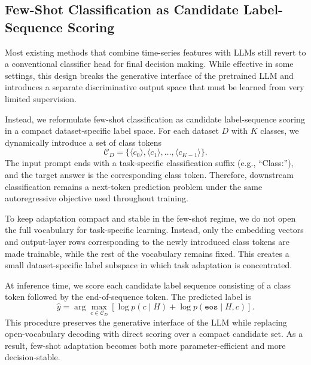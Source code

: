 \documentclass{article}
\begin{document}
        \subsection{Few-Shot Classification as Candidate Label-Sequence Scoring}
        
        Most existing methods that combine time-series features with LLMs still revert to a conventional classifier head for final decision making.
        While effective in some settings, this design breaks the generative interface of the pretrained LLM and introduces a separate discriminative output space that must be learned from very limited supervision.
        
        Instead, we reformulate few-shot classification as candidate label-sequence scoring in a compact dataset-specific label space.
        For each dataset $D$ with $K$ classes, we dynamically introduce a set of class tokens
        \begin{equation}
        \mathcal{C}_D =
        \{
        \langle c_0 \rangle, \langle c_1 \rangle, \dots, \langle c_{K-1} \rangle
        \}.
        \end{equation}
        The input prompt ends with a task-specific classification suffix (e.g., ``Class:''), and the target answer is the corresponding class token.
        Therefore, downstream classification remains a next-token prediction problem under the same autoregressive objective used throughout training.
        
        To keep adaptation compact and stable in the few-shot regime, we do not open the full vocabulary for task-specific learning.
        Instead, only the embedding vectors and output-layer rows corresponding to the newly introduced class tokens are made trainable, while the rest of the vocabulary remains fixed.
        This creates a small dataset-specific label subspace in which task adaptation is concentrated.
        
        At inference time, we score each candidate label sequence consisting of a class token followed by the end-of-sequence token.
        The predicted label is
        \begin{equation}
        \hat{y}
        =
        \arg\max_{c \in \mathcal{C}_D}
        \left[
        \log p(c \mid H)
        +
        \log p(\texttt{eos} \mid H, c)
        \right].
        \end{equation}
        This procedure preserves the generative interface of the LLM while replacing open-vocabulary decoding with direct scoring over a compact candidate set.
        As a result, few-shot adaptation becomes both more parameter-efficient and more decision-stable.
    
\end{document}
